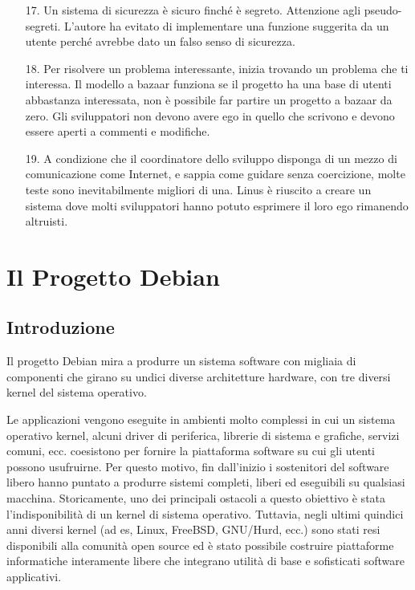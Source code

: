 \documentclass[a4paper,12pt,titlepage,oneside]{book}
\begin{document}
\begin{itemize}
    \item[17.] Un sistema di sicurezza è sicuro finché è segreto. Attenzione agli pseudo-segreti.
    L'autore ha evitato di implementare una funzione suggerita da un utente perché avrebbe dato un falso senso di sicurezza.

    \item[18.] Per risolvere un problema interessante, inizia trovando un problema che ti interessa.
    Il modello a bazaar funziona se il progetto ha una base di utenti abbastanza interessata, non è possibile far partire un progetto a bazaar da zero. Gli sviluppatori non devono avere ego in quello che scrivono e devono essere aperti a commenti e modifiche.

    \item[19.] A condizione che il coordinatore dello sviluppo disponga di un mezzo di comunicazione come Internet, e sappia come guidare senza coercizione, molte teste sono inevitabilmente migliori di una.
    Linus è riuscito a creare un sistema dove molti sviluppatori hanno potuto esprimere il loro ego rimanendo altruisti.
\end{itemize}
\chapter{Il Progetto Debian}
\section{Introduzione}
Il progetto Debian mira a produrre un sistema software con migliaia di componenti che girano su undici diverse architetture hardware, 
con tre diversi kernel del sistema operativo. 

    Le applicazioni vengono eseguite in ambienti molto complessi in cui un sistema operativo kernel, alcuni driver di periferica, librerie di sistema e grafiche, servizi comuni, ecc. coesistono per fornire la piattaforma software su cui gli utenti 
    possono usufruirne. Per questo motivo, fin dall'inizio i sostenitori del software libero hanno puntato a produrre sistemi completi, liberi ed eseguibili su qualsiasi macchina. Storicamente, uno dei principali 
    ostacoli a questo obiettivo è stata l'indisponibilità di un kernel di sistema operativo. Tuttavia, negli ultimi quindici anni diversi kernel (ad es,
    Linux, FreeBSD, GNU/Hurd, ecc.) sono stati resi disponibili alla comunità open source ed è stato possibile costruire piattaforme informatiche interamente libere che
    integrano utilità di base e sofisticati software applicativi.
    
\end{document}
